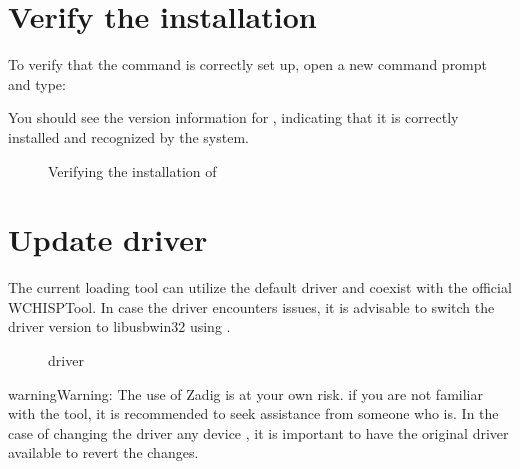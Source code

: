 \documentclass[letterpaper,10pt,english]{sphinxmanual}
\begin{document}
\section{Verify the installation}
\label{\detokenize{install_windows:verify-the-installation}}
\sphinxAtStartPar
To verify that the  command is correctly set up, open a new command prompt and type:

\begin{sphinxVerbatim}[commandchars=\\\{\}]
 
\end{sphinxVerbatim}

\sphinxAtStartPar
You should see the version information for , indicating that it is correctly installed and recognized by the system.

\begin{figure}[htbp]
\centering
\capstart

\noindent{}
\caption{Verifying the installation of }\label{\detokenize{install_windows:id5}}\label{\detokenize{install_windows:verify}}\end{figure}


\section{Update driver}
\label{\detokenize{install_windows:update-driver}}
\sphinxAtStartPar
The current loading tool can utilize the default driver and coexist with the official WCHISPTool. In case the driver encounters issues, it is advisable to switch the driver version to libusb\sphinxhyphen{}win32 using .

\begin{figure}[htbp]
\centering
\capstart

\noindent{}
\caption{driver}\label{\detokenize{install_windows:id6}}\label{\detokenize{install_windows:driver}}\end{figure}

\begin{sphinxadmonition}{warning}{Warning:}
\sphinxAtStartPar
The use of Zadig is at your own risk. if you are not familiar with the tool, it is recommended to seek assistance from someone who is. In the case of changing the driver any device  , it is important to have the original driver available to revert the changes.
\end{sphinxadmonition}
\end{document}

